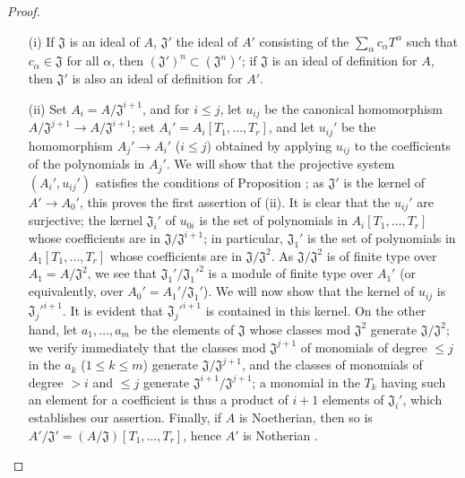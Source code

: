 \begin{proof}
\label{proof-0.7.5.4}
\medskip\noindent
\begin{enumerate}
  \item[(i)] If $\mathfrak{J}$ is an ideal of $A$, $\mathfrak{J}'$ the ideal of $A'$
    consisting of the $\sum_\alpha c_\alpha T^\alpha$ such that $c_\alpha\in\mathfrak{J}$
    for all $\alpha$, then $(\mathfrak{J}')^n\subset(\mathfrak{J}^n)'$; if $\mathfrak{J}$
    is an ideal of definition for $A$, then $\mathfrak{J}'$ is also an ideal of definition
    for $A'$.
  \item[(ii)] Set $A_i=A/\mathfrak{J}^{i+1}$, and for $i\leq j$, let $u_{ij}$ be the
    canonical homomorphism $A/\mathfrak{J}^{j+1}\to A/\mathfrak{J}^{i+1}$; set
    $A_i'=A_i[T_1,\dots,T_r]$, and let $u_{ij}'$ be the homomorphism $A_j'\to A_i'$
    ($i\leq j$) obtained by applying $u_{ij}$ to the coefficients of the polynomials
    in $A_j'$. We will show that the projective system $(A_i',u_{ij}')$ satisfies the conditions
    of Proposition ; as $\mathfrak{J}'$ is the kernel of
    $A'\to A_0'$, this proves the first assertion of (ii). It is clear that the $u_{ij}'$ are
    surjective; the kernel $\mathfrak{J}_i'$ of $u_{0i}$ is the set of polynomials in
    $A_i[T_1,\dots,T_r]$ whose coefficients are in $\mathfrak{J}/\mathfrak{J}^{i+1}$; in
    particular, $\mathfrak{J}_1'$ is the set of polynomials in $A_1[T_1,\dots,T_r]$ whose
    coefficients are in $\mathfrak{J}/\mathfrak{J}^2$. As $\mathfrak{J}/\mathfrak{J}^2$ is
    of finite type over $A_1=A/\mathfrak{J}^2$, we see that $\mathfrak{J}_1'/{\mathfrak{J}_1'}^2$
    is a module of finite type over $A_1'$ (or equivalently, over $A_0'=A_1'/\mathfrak{J}_1'$).
    We will now show that the kernel of $u_{ij}$ is ${\mathfrak{J}_j'}^{i+1}$. It is evident that
    ${\mathfrak{J}_j'}^{i+1}$ is contained in this kernel. On the other hand, let $a_1,\dots,a_m$
    be the elements of $\mathfrak{J}$ whose classes mod $\mathfrak{J}^2$ generate
    $\mathfrak{J}/\mathfrak{J}^2$; we verify immediately that the classes mod $\mathfrak{J}^{j+1}$
    of monomials of degree $\leq j$ in the $a_k$ ($1\leq k\leq m$) generate
    $\mathfrak{J}/\mathfrak{J}^{j+1}$, and the classes of monomials of degree $>i$ and
    $\leq j$ generate $\mathfrak{J}^{i+1}/\mathfrak{J}^{j+1}$; a monomial in the $T_k$
    having such an element for a coefficient is thus a product of $i+1$ elements of
    $\mathfrak{J}_i'$, which establishes our assertion. Finally, if $A$ is Noetherian, then so
    is $A'/\mathfrak{J}'=(A/\mathfrak{J})[T_1,\dots,T_r]$, hence $A'$ is Notherian .
\end{enumerate}
\end{proof}

